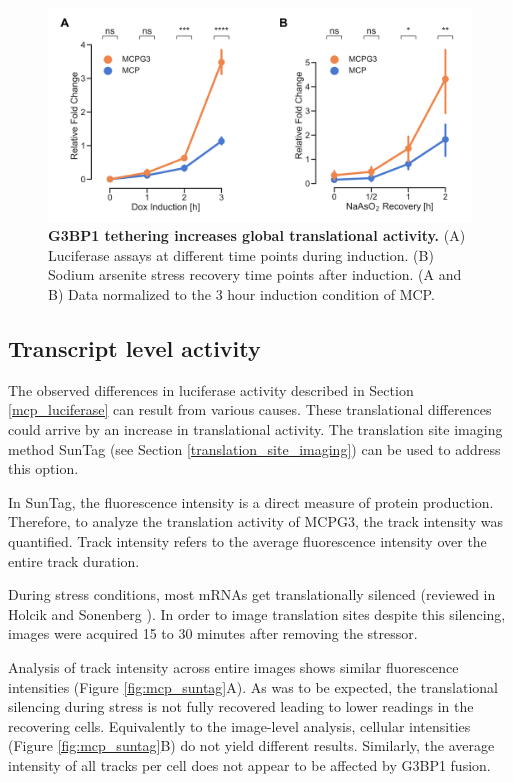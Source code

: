 \begin{figure}[h]
    \centering
    \includegraphics[width=\linewidth]{images/figure3}
    \caption{\textbf{G3BP1 tethering increases global translational activity.}
        (A) Luciferase assays at different time points during induction.
        (B) Sodium arsenite stress recovery time points after induction.
        (A and B) Data normalized to the 3 hour induction condition of MCP.     
    }
    \label{fig:mcp_luciferase}
\end{figure}

\subsection{Transcript level activity}\label{mcp_suntag}

The observed differences in luciferase activity described in Section \ref{mcp_luciferase} can result from various causes.
These translational differences could arrive by an increase in translational activity.
The translation site imaging method SunTag (see Section \ref{translation_site_imaging}) can be used to address this option.

In SunTag, the fluorescence intensity is a direct measure of protein production.
Therefore, to analyze the translation activity of MCPG3, the track intensity was quantified.
Track intensity refers to the average fluorescence intensity over the entire track duration.

During stress conditions, most mRNAs get translationally silenced (reviewed in Holcik and Sonenberg \cite{holcik_translational_2005}).
In order to image translation sites despite this silencing, images were acquired 15 to 30 minutes after removing the stressor.

Analysis of track intensity across entire images shows similar fluorescence intensities (Figure \ref{fig:mcp_suntag}A).
As was to be expected, the translational silencing during stress is not fully recovered leading to lower readings in the recovering cells.
Equivalently to the image-level analysis, cellular intensities (Figure \ref{fig:mcp_suntag}B) do not yield different results.
Similarly, the average intensity of all tracks per cell does not appear to be affected by G3BP1 fusion.

